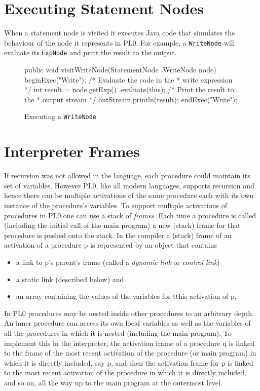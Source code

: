\documentclass[a4paper,twoside,twocolumn]{article}
\begin{document}
\section{Executing Statement Nodes}\label{section:statements}
When a statement node is visited it executes Java code that simulates the
behaviour of the node it represents in PL0. For example, a \texttt{WriteNode}
will evaluate its \texttt{ExpNode} and print the result to the output.

\begin{figure}[H]
\begin{java}
public void visitWriteNode(StatementNode
        .WriteNode node) {
    beginExec("Write");
    /* Evaluate the code in the
     * write expression */
    int result = node.getExp()
            .evaluate(this);
    /* Print the result to the 
     * output stream */
    outStream.println(result);
    endExec("Write");
}
\end{java}
\caption{Executing a \texttt{WriteNode}}\label{figure:writenode}
\end{figure}

\section{Interpreter Frames}\label{section:frame}

If recursion was not allowed in the language,
each procedure could maintain its set of variables.
However PL0, like all modern languages, supports recursion
and hence there can be multiple activations of the same procedure
each with its own instance of the procedure's variables.
To support multiple activations of procedures in PL0 
one can use a stack of \emph{frames}.
Each time a procedure is called 
(including the initial call of the main program)
a new (stack) frame for that procedure is pushed onto the stack.
In the compiler a (stack) frame of an activation of a procedure \textsf{p} 
is represented by an object that contains 
\begin{itemize}
\item
a link to \textsf{p}'s parent's frame 
(called a \emph{dynamic link} or \emph{control link})
\item
a static link (described below)
and 
\item
an array containing the values of the variables for tthis activation of \textsf{p}.
\end{itemize}

In PL0 procedures may be nested inside other procedures to an arbitrary depth.
An inner procedure can access its own local variables
as well as the variables of all the procedures in which it is nested 
(including the main program).
To implement this in the interpreter, the activation frame of a procedure \textsf{q}
is linked to the frame of the most recent activation of the procedure (or main program)
in which it is directly included, say \textsf{p}, and then the activation frame 
for \textsf{p} is linked to the most recent activation of the procedure in 
which it is directly included, and so on, all the way up to the main program
at the outermost level. 
\end{document}
